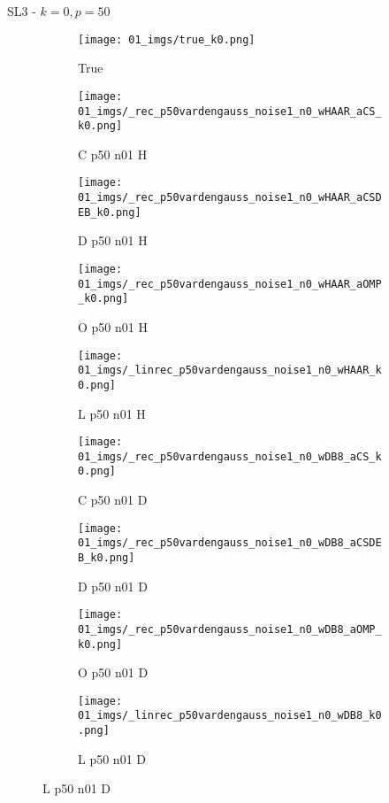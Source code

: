 \begin{frame}{SL3 - $k=0,p=50$}{}
\begin{figure}
\begin{subfigure}{0.1\textwidth}
\texttt{[image: 01\_imgs/true\_k0.png]}
\caption*{\Tiny True}
\end{subfigure}
\begin{subfigure}{0.1\textwidth}
\texttt{[image: 01\_imgs/\_rec\_p50vardengauss\_noise1\_n0\_wHAAR\_aCS\_k0.png]}
\caption*{\Tiny C p50 n01 H}
\end{subfigure}
\begin{subfigure}{0.1\textwidth}
\texttt{[image: 01\_imgs/\_rec\_p50vardengauss\_noise1\_n0\_wHAAR\_aCSDEB\_k0.png]}
\caption*{\Tiny D p50 n01 H}
\end{subfigure}
\begin{subfigure}{0.1\textwidth}
\texttt{[image: 01\_imgs/\_rec\_p50vardengauss\_noise1\_n0\_wHAAR\_aOMP\_k0.png]}
\caption*{\Tiny O p50 n01 H}
\end{subfigure}
\begin{subfigure}{0.1\textwidth}
\texttt{[image: 01\_imgs/\_linrec\_p50vardengauss\_noise1\_n0\_wHAAR\_k0.png]}
\caption*{\Tiny L p50 n01 H}
\end{subfigure}
\begin{subfigure}{0.1\textwidth}
\texttt{[image: 01\_imgs/\_rec\_p50vardengauss\_noise1\_n0\_wDB8\_aCS\_k0.png]}
\caption*{\Tiny C p50 n01 D}
\end{subfigure}
\begin{subfigure}{0.1\textwidth}
\texttt{[image: 01\_imgs/\_rec\_p50vardengauss\_noise1\_n0\_wDB8\_aCSDEB\_k0.png]}
\caption*{\Tiny D p50 n01 D}
\end{subfigure}
\begin{subfigure}{0.1\textwidth}
\texttt{[image: 01\_imgs/\_rec\_p50vardengauss\_noise1\_n0\_wDB8\_aOMP\_k0.png]}
\caption*{\Tiny O p50 n01 D}
\end{subfigure}
\begin{subfigure}{0.1\textwidth}
\texttt{[image: 01\_imgs/\_linrec\_p50vardengauss\_noise1\_n0\_wDB8\_k0.png]}
\caption*{\Tiny L p50 n01 D}
\end{subfigure}

\vspace{5pt}


\end{figure}
\end{frame}
